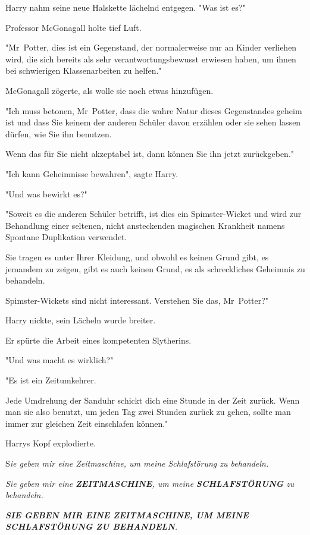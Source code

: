 {Harry nahm seine neue Halskette lächelnd entgegen. "Was ist es?"

Professor McGonagall holte tief Luft.

"Mr~Potter, dies ist ein Gegenstand, der normalerweise nur an Kinder verliehen wird, die sich bereits als sehr verantwortungsbewusst erwiesen haben, um ihnen bei schwierigen Klassenarbeiten zu helfen."

McGonagall zögerte, als wolle sie noch etwas hinzufügen.

"Ich muss betonen, Mr~Potter, dass die wahre Natur dieses Gegenstandes geheim ist und dass Sie keinem der anderen Schüler davon erzählen oder sie sehen lassen dürfen, wie Sie ihn benutzen.

Wenn das für Sie nicht akzeptabel ist, dann können Sie ihn jetzt zurückgeben."

"Ich kann Geheimnisse bewahren", sagte Harry.

"Und was bewirkt es?"

"Soweit es die anderen Schüler betrifft, ist dies ein Spimster-Wicket und wird zur Behandlung einer seltenen, nicht ansteckenden magischen Krankheit namens Spontane Duplikation verwendet.

Sie tragen es unter Ihrer Kleidung, und obwohl es keinen Grund gibt, es jemandem zu zeigen, gibt es auch keinen Grund, es als schreckliches Geheimnis zu behandeln.

Spimster-Wickets sind nicht interessant. Verstehen Sie das, Mr~Potter?"

Harry nickte, sein Lächeln wurde breiter.

Er spürte die Arbeit eines kompetenten Slytherins.

"Und was macht es wirklich?"

"Es ist ein Zeitumkehrer.

Jede Umdrehung der Sanduhr schickt dich eine Stunde in der Zeit zurück. Wenn man sie also benutzt, um jeden Tag zwei Stunden zurück zu gehen, sollte man immer zur gleichen Zeit einschlafen können."

Harrys Kopf explodierte.

S\emph{ie geben mir eine Zeitmaschine, um meine Schlafstörung zu behandeln.}

\emph{Sie geben mir eine} \textbf{\emph{ZEITMASCHINE}}\emph{, um meine} \textbf{\emph{SCHLAFSTÖRUNG}} \emph{zu behandeln.}

\emph{\hfill\break }\textbf{\emph{SIE GEBEN MIR EINE ZEITMASCHINE, UM MEINE SCHLAFSTÖRUNG ZU BEHANDELN}}\emph{.}

}

